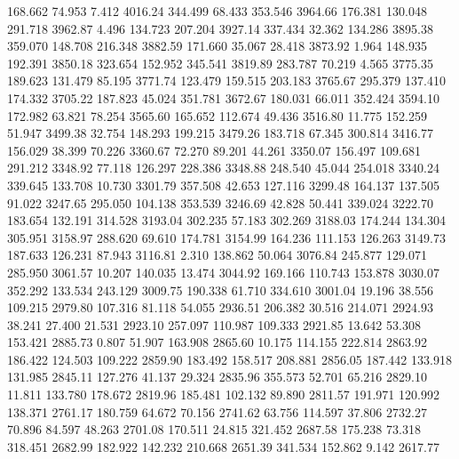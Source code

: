  168.662   74.953    7.412      4016.24
 344.499   68.433  353.546      3964.66
 176.381  130.048  291.718      3962.87
   4.496  134.723  207.204      3927.14
 337.434   32.362  134.286      3895.38
 359.070  148.708  216.348      3882.59
 171.660   35.067   28.418      3873.92
   1.964  148.935  192.391      3850.18
 323.654  152.952  345.541      3819.89
 283.787   70.219    4.565      3775.35
 189.623  131.479   85.195      3771.74
 123.479  159.515  203.183      3765.67
 295.379  137.410  174.332      3705.22
 187.823   45.024  351.781      3672.67
 180.031   66.011  352.424      3594.10
 172.982   63.821   78.254      3565.60
 165.652  112.674   49.436      3516.80
  11.775  152.259   51.947      3499.38
  32.754  148.293  199.215      3479.26
 183.718   67.345  300.814      3416.77
 156.029   38.399   70.226      3360.67
  72.270   89.201   44.261      3350.07
 156.497  109.681  291.212      3348.92
  77.118  126.297  228.386      3348.88
 248.540   45.044  254.018      3340.24
 339.645  133.708   10.730      3301.79
 357.508   42.653  127.116      3299.48
 164.137  137.505   91.022      3247.65
 295.050  104.138  353.539      3246.69
  42.828   50.441  339.024      3222.70
 183.654  132.191  314.528      3193.04
 302.235   57.183  302.269      3188.03
 174.244  134.304  305.951      3158.97
 288.620   69.610  174.781      3154.99
 164.236  111.153  126.263      3149.73
 187.633  126.231   87.943      3116.81
   2.310  138.862   50.064      3076.84
 245.877  129.071  285.950      3061.57
  10.207  140.035   13.474      3044.92
 169.166  110.743  153.878      3030.07
 352.292  133.534  243.129      3009.75
 190.338   61.710  334.610      3001.04
  19.196   38.556  109.215      2979.80
 107.316   81.118   54.055      2936.51
 206.382   30.516  214.071      2924.93
  38.241   27.400   21.531      2923.10
 257.097  110.987  109.333      2921.85
  13.642   53.308  153.421      2885.73
   0.807   51.907  163.908      2865.60
  10.175  114.155  222.814      2863.92
 186.422  124.503  109.222      2859.90
 183.492  158.517  208.881      2856.05
 187.442  133.918  131.985      2845.11
 127.276   41.137   29.324      2835.96
 355.573   52.701   65.216      2829.10
  11.811  133.780  178.672      2819.96
 185.481  102.132   89.890      2811.57
 191.971  120.992  138.371      2761.17
 180.759   64.672   70.156      2741.62
  63.756  114.597   37.806      2732.27
  70.896   84.597   48.263      2701.08
 170.511   24.815  321.452      2687.58
 175.238   73.318  318.451      2682.99
 182.922  142.232  210.668      2651.39
 341.534  152.862    9.142      2617.77
